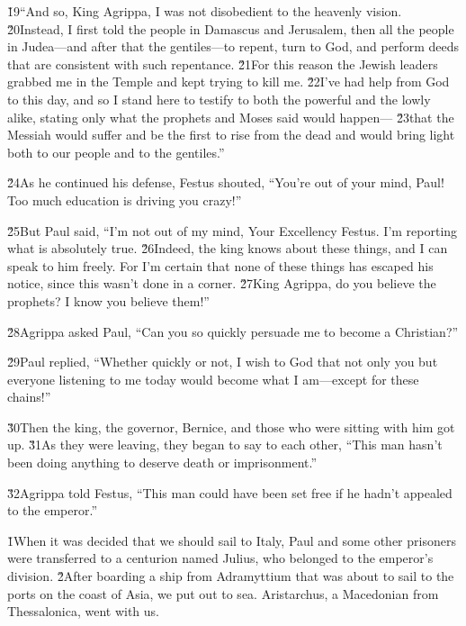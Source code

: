 \v{19}``And so, King Agrippa, I was not disobedient to the heavenly vision. \v{20}Instead, I first told the people in Damascus and Jerusalem, then all the people in Judea---and after that the gentiles---to repent, turn to God, and perform deeds that are consistent with such repentance. \v{21}For this reason the Jewish leaders grabbed me in the Temple and kept trying to kill me. \v{22}I've had help from God to this day, and so I stand here to testify to both the powerful and the lowly alike, stating only what the prophets and Moses said would happen--- \v{23}that the Messiah would suffer and be the first to rise from the dead and would bring light both to our people and to the gentiles.''

\v{24}As he continued his defense, Festus shouted, ``You're out of your mind, Paul! Too much education is driving you crazy!''

\v{25}But Paul said, ``I'm not out of my mind, Your Excellency Festus. I'm reporting what is absolutely true. \v{26}Indeed, the king knows about these things, and I can speak to him freely. For I'm certain that none of these things has escaped his notice, since this wasn't done in a corner. \v{27}King Agrippa, do you believe the prophets? I know you believe them!''

\v{28}Agrippa asked Paul, ``Can you so quickly persuade me to become a Christian?''

\v{29}Paul replied, ``Whether quickly or not, I wish to God that not only you but everyone listening to me today would become what I am---except for these chains!''

\v{30}Then the king, the governor, Bernice, and those who were sitting with him got up. \v{31}As they were leaving, they began to say to each other, ``This man hasn't been doing anything to deserve death or imprisonment.''

\v{32}Agrippa told Festus, ``This man could have been set free if he hadn't appealed to the emperor.''

\v{1}When it was decided that we should sail to Italy, Paul and some other prisoners were transferred to a centurion named Julius, who belonged to the emperor's division. \v{2}After boarding a ship from Adramyttium that was about to sail to the ports on the coast of Asia, we put out to sea. Aristarchus, a Macedonian from Thessalonica, went with us.

